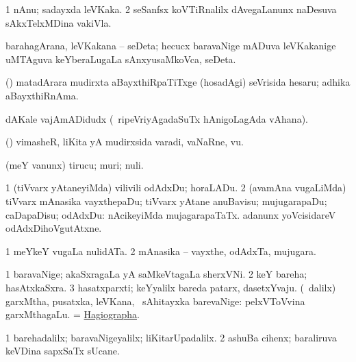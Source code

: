 \noindent 
\gl{\pagu}
\expl{}
\bmng
\bnum
\num{1}  nAnu; sadayxda leVKaka. 
\num{2}  seSanfsx koVTiRnalilx dAvegaLanunx naDesuva sAkxTelxMDina vakiVla. 
\enum
\emng
\eentry

\bentry 
{} 
\gl{\nA}
\expl{}
\bmng
barahagArana, leVKakana -- seDeta; hecucx baravaNige mADuva leVKakanige uMTAguva keYberaLugaLa sAnxyusaMkoVca, seDeta. 
\emng
\eentry

\bentry
{} 
\gl{\nA}
\expl{}
\bmng
(\ame) matadArara mudirxta aBayxthiRpaTiTxge (hosadAgi) seVrisida hesaru; adhika aBayxthiRnAma. 
\emng
\eentry

\bentry
{} 
\gl{\nA}
\expl{}
\bmng
dAKale vajAmADidudx (\kanmu\ ripeVriyAgadaSuTx hAnigoLagAda vAhana). 
\emng
\eentry

\bentry
{} 
\gl{\nA}
\expl{}
\bmng
(\AmA) vimasheR, liKita yA mudirxsida varadi, vaNaRne, \mo vu. 
\emng
\eentry

\bentry
{} 
\gl{\sakirx}
\expl{}
\bmng
(meY \mo vanunx) tirucu; muri; nuli. 
\emng

\noindent
\gl{\akirx}
\expl{}
\bmng
\bnum
\num{1} (tiVvarx yAtaneyiMda) vilivili odAdxDu; horaLADu. 
\num{2} (avamAna \mo vugaLiMda) tiVvarx mAnasika vayxthepaDu; tiVvarx yAtane anuBavisu; mujugarapaDu; caDapaDisu; odAdxDu:  nAcikeyiMda mujagarapaTaTx.  adanunx yoVcisidareV odAdxDihoVgutAtxne. 
\enum
\emng
\eentry

\bentry
{} 
\gl{\nA}
\expl{}
\bmng
\bnum
\num{1} meYkeY \mo vugaLa nulidATa. 
\num{2} mAnasika -- vayxthe, odAdxTa, mujugara. 
\enum
\emng
\eentry

\bentry
{} 
\gl{\nA}
\expl{}
\bmng
\bnum
\num{1} baravaNige; akaSxragaLa yA saMkeVtagaLa sherxVNi. 
\num{2} keY bareha; hasAtxkaSxra. 
\num{3} hasatxparxti; keYyalilx bareda patarx, dasetxYvaju. 
 (\sA\ \bava dalilx) 
\banum
{} garxMtha, pusatxka, leVKana, \mo\ sAhitayxka barevaNige:  pelxVToVvina garxMthagaLu. 
  = \hyperref{kandict_h.pdf}{H}{hagiographa}{Hagiographa}. 
\eanum
\numie
\enum
\emng

\noindent
\gl{\pagu}
\expl{}
\bmng
\bnum
\num{1}  barehadalilx; baravaNigeyalilx; liKitarUpadalilx. 
\hypertarget{writing pagu(2)}{} 
\num{2}  ashuBa cihenx; baraliruva keVDina sapxSaTx sUcane. 
\enum
\emng
\eentry

